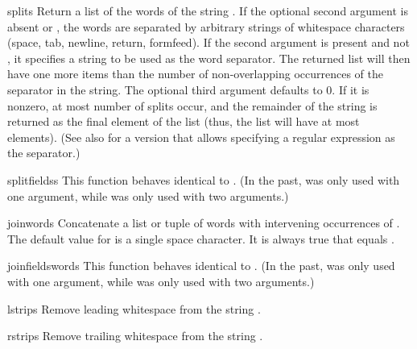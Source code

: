 \begin{funcdesc}{split}{s}
Return a list of the words of the string .  If the optional
second argument  is absent or , the words are
separated by arbitrary strings of whitespace characters (space, tab,
newline, return, formfeed).  If the second argument  is
present and not , it specifies a string to be used as the
word separator.  The returned list will then have one more items than
the number of non-overlapping occurrences of the separator in the
string.  The optional third argument  defaults to 0.  If
it is nonzero, at most  number of splits occur, and the
remainder of the string is returned as the final element of the list
(thus, the list will have at most  elements).
(See also  for a version that allows specifying a
regular expression as the separator.)
\end{funcdesc}

\begin{funcdesc}{splitfields}{s}
This function behaves identical to .  (In the past,
 was only used with one argument, while 
was only used with two arguments.)
\end{funcdesc}

\begin{funcdesc}{join}{words}
Concatenate a list or tuple of words with intervening occurrences of
.  The default value for  is a single space character.
It is always true that
equals .
\end{funcdesc}

\begin{funcdesc}{joinfields}{words}
This function behaves identical to .  (In the past,
 was only used with one argument, while 
was only used with two arguments.)
\end{funcdesc}

\begin{funcdesc}{lstrip}{s}
Remove leading whitespace from the string .
\end{funcdesc}

\begin{funcdesc}{rstrip}{s}
Remove trailing whitespace from the string .
\end{funcdesc}

